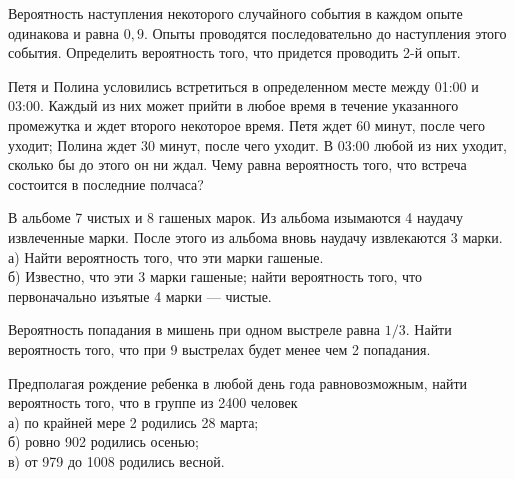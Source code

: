 \newpage\setcounter{zad}{0}



\begin{zkrW}{20}\noindent 
	Вероятность наступления некоторого случайного события в каждом опыте одинакова и равна $0{,}9$. Опыты проводятся последовательно до наступления этого события. Определить вероятность того, что придется проводить 2-й опыт.
 
\end{zkrW}

\begin{zkrW}{20}\noindent 
	Петя и Полина условились встретиться в определенном месте между 01:00 и 03:00. Каждый из них может прийти в любое время в течение указанного промежутка и ждет второго некоторое время. Петя ждет 60 минут, после чего уходит; Полина ждет 30 минут, после чего уходит. В 03:00 любой из них уходит, сколько бы до этого он ни ждал. Чему равна вероятность того, что встреча состоится в последние полчаса?
 
\end{zkrW}

\begin{zkrW}{20}\noindent 
	В альбоме 7 чистых и 8 гашеных марок. Из альбома изымаются 4 наудачу извлеченные марки. После этого из альбома вновь наудачу извлекаются 3 марки. \\ \indent а) Найти вероятность того, что эти марки гашеные. \\ \indent б) Известно, что эти 3 марки гашеные; найти вероятность того, что первоначально изъятые 4 марки --- чистые.
 
\end{zkrW}

\begin{zkrW}{20}\noindent 
	Вероятность попадания в мишень при одном выстреле равна $1/3$. Найти вероятность того, что при 9 выстрелах будет менее чем 2 попадания.
 
\end{zkrW}

\begin{zkrW}{20}\noindent 
	Предполагая рождение ребенка в любой день года равновозможным, найти вероятность того, что в группе из 2400 человек \\ \indent а) по крайней мере 2 родились 28 марта; \\ \indent б) ровно 902 родились осенью; \\ \indent в) от 979 до 1008 родились весной.
 
\end{zkrW}

